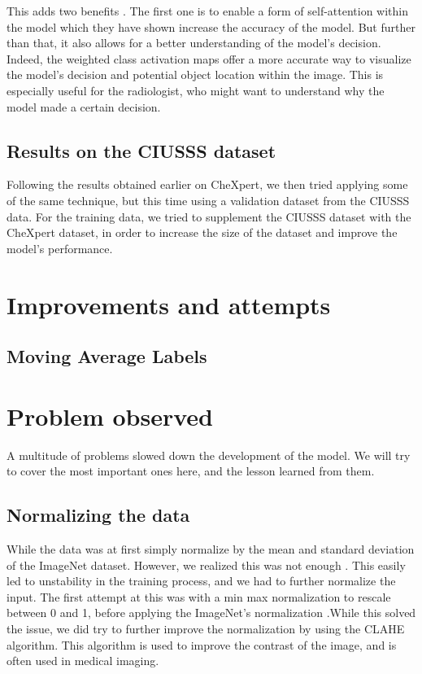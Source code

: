 \documentclass[11pt]{article}
\begin{document}
            This adds two benefits . The first one is to enable a form of self-attention within the model which they have shown increase the accuracy of the model.
            But further than that, it also allows for a better understanding of the model's decision. Indeed, the weighted class activation maps offer a more accurate way to visualize the model's decision and potential object location
            within the image. This is especially useful for the radiologist, who might want to understand why the model made a certain decision.


        \subsection{Results on the CIUSSS dataset}


            Following the results obtained earlier on CheXpert, we then tried applying some of the same technique, but this time using a validation dataset from the CIUSSS data.
            For the training data, we tried to supplement the CIUSSS dataset with the CheXpert dataset, in order to increase the size of the dataset and improve the model's performance.







    \section{Improvements and attempts}

    \subsection{Moving Average Labels}


    \section{Problem observed}

    A multitude of problems slowed down the development of the model. We will try to cover the most
    important ones here, and the lesson learned from them.


    \subsection{Normalizing the data}

        While the data was at first simply normalize by the mean and standard deviation of the ImageNet dataset.
        However, we realized this was not enough . This easily led to unstability in the training process, and we had to further
        normalize the input. The first attempt at this was with a min max normalization to rescale between 0 and 1, before applying the ImageNet's normalization
        .While this solved the issue, we did try to further improve the normalization by using the CLAHE algorithm. This algorithm is used to improve the contrast of the image, and is often used in medical imaging.
\end{document}
